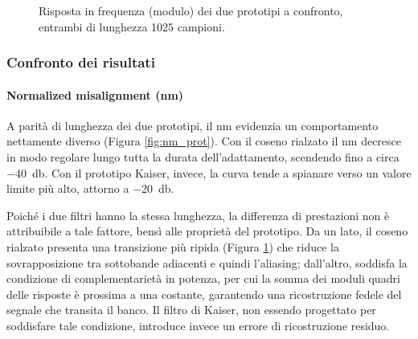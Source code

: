 \documentclass[11pt,a4paper]{article}
\begin{document}
	\begin{figure}[H]
		\centering
		\caption{Risposta in frequenza (modulo) dei due prototipi a confronto, entrambi di lunghezza 1025 campioni.}
		\label{fig:mag_prot}
	\end{figure}
	
	\subsubsection{Confronto dei risultati}
	
	\paragraph{Normalized misalignment (\ac{nm})}
	A parità di lunghezza dei due prototipi, il \ac{nm} evidenzia un comportamento nettamente diverso (Figura \ref{fig:nm_prot}).
	Con il coseno rialzato il \ac{nm} decresce in modo regolare lungo tutta la durata dell'adattamento, scendendo fino a circa \SI{-40}{\decibel}.
	Con il prototipo Kaiser, invece, la curva tende a spianare verso un valore limite più alto, attorno a \SI{-20}{\decibel}.
	
	Poiché i due filtri hanno la stessa lunghezza, la differenza di prestazioni non è attribuibile a tale fattore, bensì alle proprietà del prototipo.
	Da un lato, il coseno rialzato presenta una transizione più ripida (Figura \ref{fig:mag_prot}) che riduce la sovrapposizione tra sottobande adiacenti e quindi l'aliasing; dall'altro, soddisfa la condizione di complementarietà in potenza, per cui la somma dei moduli quadri delle risposte è prossima a una costante, garantendo una ricostruzione fedele del segnale che transita il banco.
	Il filtro di Kaiser, non essendo progettato per soddisfare tale condizione, introduce invece un errore di ricostruzione residuo.
	
\end{document}
